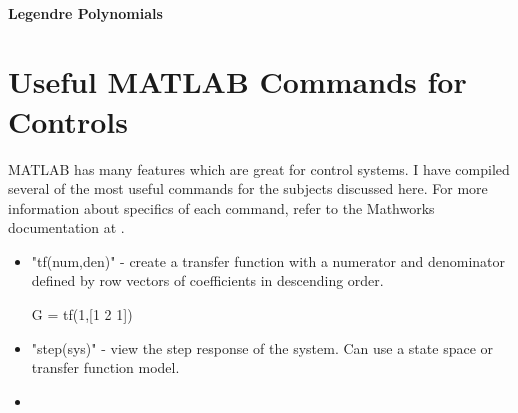 \subsubsection{Legendre Polynomials}


\chapter{Useful MATLAB Commands for Controls}
MATLAB has many features which are great for control systems. I have compiled several of the most useful commands for the subjects discussed here. For more information about specifics of each command, refer to the Mathworks documentation at \cite{mathworks_control_2026}.

\begin{itemize}
    \item "tf(num,den)" - create a transfer function with a numerator and denominator defined by row vectors of coefficients in descending order.
\begin{matlabscript}
G = tf(1,[1 2 1])
\end{matlabscript}
    \item "step(sys)" - view the step response of the system. Can use a state space or transfer function model.
    \item 
\end{itemize}








